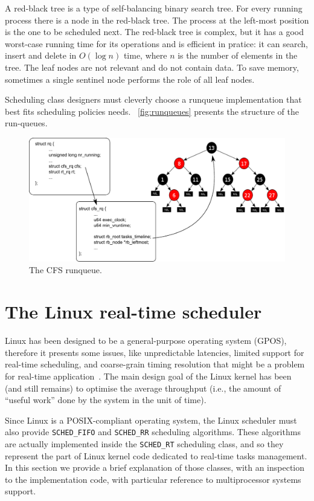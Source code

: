 A red-black tree is a type of self-balancing binary search tree. For
every running process there is a node in the red-black tree. The
process at the left-most position is the one to be scheduled next. The
red-black tree is complex, but it has a good worst-case running time
for its operations and is efficient in pratice: it can search, insert
and delete in $O(\log n)$ time, where $n$ is the number of elements in
the tree. The leaf nodes are not relevant and do not contain data. To
save memory, sometimes a single sentinel node performs the role of all
leaf nodes.

Scheduling class designers must cleverly choose a runqueue
implementation that best fits scheduling policies
needs. \figurename~\vref{fig:runqueues} presents the structure of the
run-queues.

\begin{figure}[htbp]
    \includegraphics[width=\columnwidth]{images/runqueues}
    \caption{The CFS runqueue.}
    \label{fig:runqueues}
\end{figure}

\section{The Linux real-time scheduler}

Linux has been designed to be a general-purpose operating system
(GPOS), therefore it presents some issues, like unpredictable
latencies, limited support for real-time scheduling, and coarse-grain
timing resolution that might be a problem for real-time
application~\cite{LipariScordino2006}. The main design goal of the
Linux kernel has been (and still remains) to optimise the average
throughput (i.e., the amount of ``useful work'' done by the system in
the unit of time).

Since Linux is a POSIX-compliant operating system, the Linux scheduler
must also provide \texttt{SCHED\_FIFO} and \texttt{SCHED\_RR}
scheduling algorithms. These algorithms are actually implemented
inside the \texttt{SCHED\_RT} scheduling class, and so they represent
the part of Linux kernel code dedicated to real-time tasks
management. In this section we provide a brief explanation of those
classes, with an inspection to the implementation code, with
particular reference to multiprocessor systems support.

